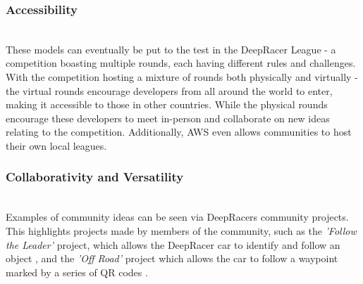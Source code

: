 \documentclass{l4proj}
\begin{document}
\subsubsection{Accessibility} \hfill \\
These models can eventually be put to the test in the DeepRacer League - a competition boasting multiple rounds, each having different rules and challenges. With the competition hosting a mixture of rounds both physically and virtually - the virtual rounds encourage developers from all around the world to enter, making it accessible to those in other countries. While the physical rounds encourage these developers to meet in-person and collaborate on new ideas relating to the competition. Additionally, AWS even allows communities to host their own local leagues.

\subsubsection{Collaborativity and Versatility} \hfill \\
Examples of community ideas can be seen via DeepRacers community projects. This highlights projects made by members of the community, such as the \textit{'Follow the Leader'} project, which allows the DeepRacer car to identify and follow an object \citep{DeepracerFollowTheLeader}, and the \textit{'Off Road'} project which allows the car to follow a waypoint marked by a series of QR codes \citep{DeepracerOffRoad}.
\end{document}
